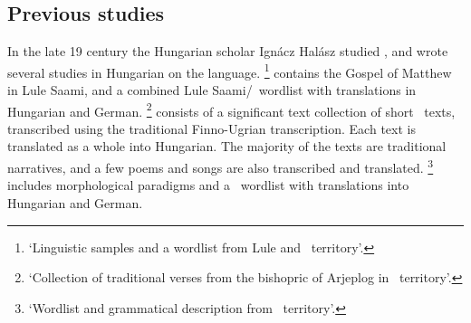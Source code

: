 \subsection{Previous studies}\label{previousWork}
%
In the late 19 century the Hungarian scholar Ignácz Halász studied \PS, and wrote several studies in Hungarian on the language. 
\footnote{‘Linguistic samples and a wordlist from Lule and \PS\ territory’.} \citep{Halasz1885} contains the Gospel of Matthew in Lule Saami, and a combined Lule Saami/\PS\ wordlist with translations in Hungarian and German. 
\footnote{‘Collection of traditional verses from the bishopric of Arjeplog in \PS\ territory’.} \citep{Halasz1893} 
consists of a significant text collection of short \PS\ texts, transcribed using the traditional Finno-Ugrian transcription. Each text is translated as a whole into Hungarian. The majority of the texts are traditional narratives, %
and a few poems and songs are also transcribed and translated. 
\footnote{‘Wordlist and grammatical description from \PS\ territory’.} \citep{Halasz1896} 
includes morphological paradigms and a \PS\ wordlist with translations into Hungarian and German. 

